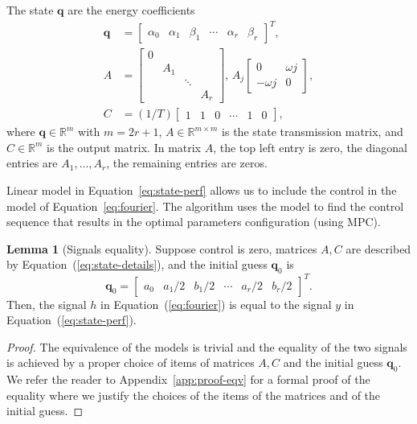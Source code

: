 \documentclass[letterpaper,10pt,conference]{ieeeconf}
\theoremstyle{definition}
\newtheorem{lem}[thm]{Lemma}
\begin{document}
The state $\mathbf{q}$ are the energy coefficients
\begin{equation}\label{eq:state-details}\begin{split}
  \mathbf{q}&=\left[\begin{array}{cccccc}
    \alpha_0 & \alpha_1 & \beta_1 & \cdots & \alpha_r & \beta_r
  \end{array}\right]^T,\\
  A&=\left[\begin{array}{cccc}
    0&    &       &  \\
     & A_1&       &  \\
     &    & \ddots&  \\
     &    &       & A_r 
  \end{array}\right],\,A_j\begin{bmatrix}0 & \omega j \\ -\omega j & 0\end{bmatrix},\\
  C&=(1/T)\left[\begin{array}{cccccc}
    1 & 1 & 0 &\cdots & 1 & 0
  \end{array}\right],
\end{split}\end{equation}
where $\mathbf{q}\in\mathbb{R}^m$ with $m=2r+1$, $A\in\mathbb{R}^{m\times m}$ is the state transmission matrix, and $C\in\mathbb{R}^m$ is the output matrix. In matrix $A$, the top left entry is zero, the diagonal entries are $A_1,\dots,A_r$, the remaining entries are zeros.

Linear model in Equation~\ref{eq:state-perf} allows us to include the control in the model of Equation~\ref{eq:fourier}. The algorithm uses the model to find the control sequence that results in the optimal parameters configuration (using MPC). 

\begin{lem}[Signals equality]\label{lem:eqv}Suppose control is zero, matrices $A,C$ are described by Equation~(\ref{eq:state-details}), and the initial guess $\mathbf{q}_0$ is 
  \begin{equation*}
  \mathbf{q}_0=\begin{bmatrix}a_0 & a_1/2 & b_1/2 & \cdots & a_r/2 & b_r/2\end{bmatrix}^T.
  \end{equation*} 
  Then, the signal $h$ in Equation~(\ref{eq:fourier}) is equal to the signal $y$ in Equation~(\ref{eq:state-perf}).
\end{lem}
\begin{proof}
The equivalence of the models is trivial and the equality of the two signals is achieved by a proper choice of items of matrices $A,C$ and the initial guess $\mathbf{q}_0$. We refer the reader to Appendix~\ref{app:proof-eqv} for a formal proof of the equality where we justify the choices of the items of the matrices and of the initial guess. 
\end{proof}
\end{document}
